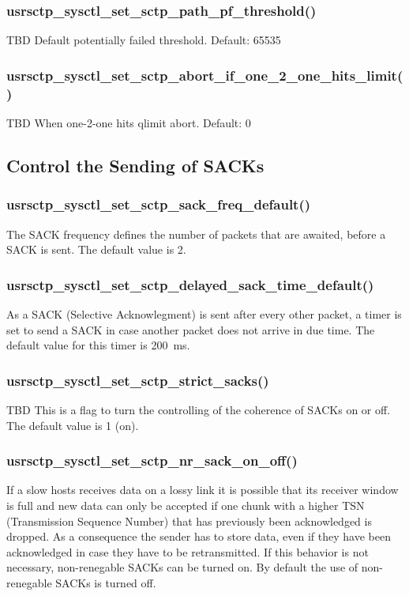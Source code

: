 \documentclass[a4paper]{article}
\begin{document}
\subsubsection{usrsctp\_sysctl\_set\_sctp\_path\_pf\_threshold()}
TBD
Default potentially failed threshold. Default: 65535		

\subsubsection{usrsctp\_sysctl\_set\_sctp\_abort\_if\_one\_2\_one\_hits\_limit()}
TBD
When one-2-one hits qlimit abort. Default: 0

		
\subsection{Control the Sending of SACKs}
\subsubsection{usrsctp\_sysctl\_set\_sctp\_sack\_freq\_default()}
The SACK frequency defines the number of packets that are awaited, before a SACK is sent. 
The default value is 2.

\subsubsection{usrsctp\_sysctl\_set\_sctp\_delayed\_sack\_time\_default()}
As a SACK (Selective Acknowlegment) is sent after every other packet, a timer is set to send a
SACK in case another packet does not arrive in due time. The default value for this timer is
200~ms.

\subsubsection{usrsctp\_sysctl\_set\_sctp\_strict\_sacks()}
TBD
This is a flag to turn the controlling of the coherence of SACKs on or off. The default value is
1 (on).

\subsubsection{usrsctp\_sysctl\_set\_sctp\_nr\_sack\_on\_off()}
If a slow hosts receives data on a lossy link it is possible that its receiver window is full and new 
data can only be accepted if one chunk with a higher TSN (Transmission Sequence Number) that has 
previously been acknowledged is dropped. As a consequence the sender has to store data, even if
they have been acknowledged in case they have to be retransmitted. If this behavior is not necessary,
non-renegable SACKs can be turned on. 
By default the use of non-renegable SACKs is turned off.
\end{document}

